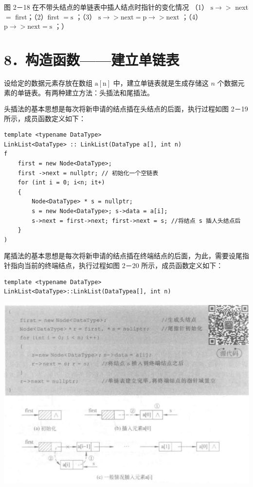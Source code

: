 \documentclass[10pt]{article}
\begin{document}
图 2－18 在不带头结点的单链表中插人结点时指针的变化情况 （1） $\mathrm{s} \longrightarrow>$ next $=$ first；（2）first $=\mathrm{s}$ ；（3） $\mathrm{s} \longrightarrow>\mathrm{next}=\mathrm{p} \longrightarrow>\mathrm{next}$ ；（4） $\mathrm{p} \longrightarrow>\mathrm{next}=\mathrm{s}$ ；）

\section*{8．构造函数——建立单链表}
设给定的数据元素存放在数组 $\mathrm{a}[\mathrm{n}]$ 中，建立单链表就是生成存储这 $n$ 个数据元素的单链表。有两种建立方法：头插法和尾插法。

头插法的基本思想是每次将新申请的结点插在头结点的后面，执行过程如图 2－19 所示，成员函数定义如下：

\begin{verbatim}
template <typename DataType>
LinkList<DataType> :: LinkList(DataType a[], int n)
f
    first = new Node<DataType>;
    first ->next = nullptr; // 初始化一个空链表
    for (int i = 0; i<n; it+)
    {
        Node<DataType> * s = nullptr;
        s = new Node<DataType>; s->data = a[i];
        s->next = first->next; first->next = s; //将结点 s 插人头结点后
    }
)
\end{verbatim}

尾插法的基本思想是每次将新申请的结点插在终端结点的后面，为此，需要设尾指针指向当前的终端结点，执行过程如图 2－20 所示，成员函数定义如下：

\begin{verbatim}
template <typename DataType>
LinkList<DataType>::LinkList(DataTypea[], int n)
\end{verbatim}

\begin{center}
\includegraphics[max width=\textwidth]{2025_06_06_704745ea57b15b2333e5g-059(1)}
\end{center}
\end{document}
